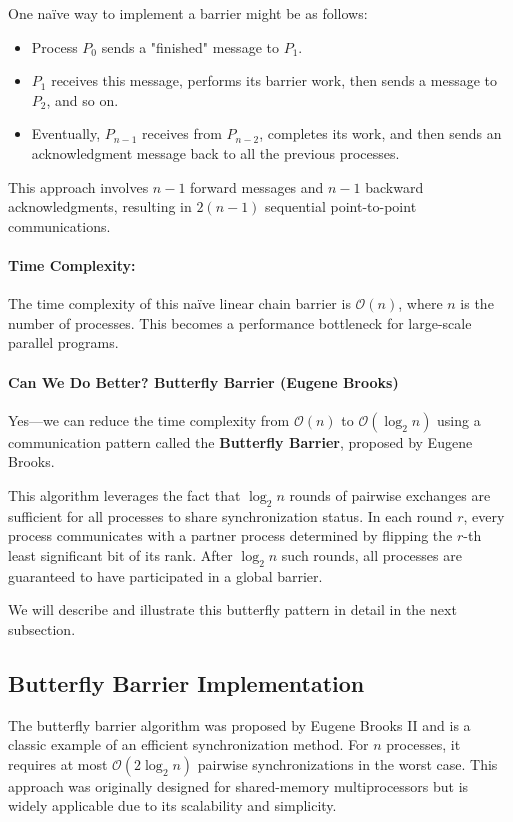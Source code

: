 \documentclass[12pt]{book}
\begin{document}
One naïve way to implement a barrier might be as follows:
\begin{itemize}
    \item Process $P_0$ sends a "finished" message to $P_1$.
    \item $P_1$ receives this message, performs its barrier work, then sends a message to $P_2$, and so on.
    \item Eventually, $P_{n-1}$ receives from $P_{n-2}$, completes its work, and then sends an acknowledgment message back to all the previous processes.
\end{itemize}
This approach involves $n - 1$ forward messages and $n - 1$ backward acknowledgments, resulting in $2(n - 1)$ sequential point-to-point communications.

\paragraph{Time Complexity:}  
The time complexity of this naïve linear chain barrier is $\mathcal{O}(n)$, where $n$ is the number of processes. This becomes a performance bottleneck for large-scale parallel programs.

\paragraph{Can We Do Better? Butterfly Barrier (Eugene Brooks)}  
Yes—we can reduce the time complexity from $\mathcal{O}(n)$ to $\mathcal{O}(\log_2 n)$ using a communication pattern called the \textbf{Butterfly Barrier}, proposed by Eugene Brooks.

This algorithm leverages the fact that $\log_2 n$ rounds of pairwise exchanges are sufficient for all processes to share synchronization status. In each round $r$, every process communicates with a partner process determined by flipping the $r$-th least significant bit of its rank. After $\log_2 n$ such rounds, all processes are guaranteed to have participated in a global barrier.

We will describe and illustrate this butterfly pattern in detail in the next subsection.
\subsection*{Butterfly Barrier Implementation}

The butterfly barrier algorithm was proposed by Eugene Brooks II and is a classic example of an efficient synchronization method. For $n$ processes, it requires at most $\mathcal{O}(2\log_2 n)$ pairwise synchronizations in the worst case. This approach was originally designed for shared-memory multiprocessors but is widely applicable due to its scalability and simplicity.
\end{document}
